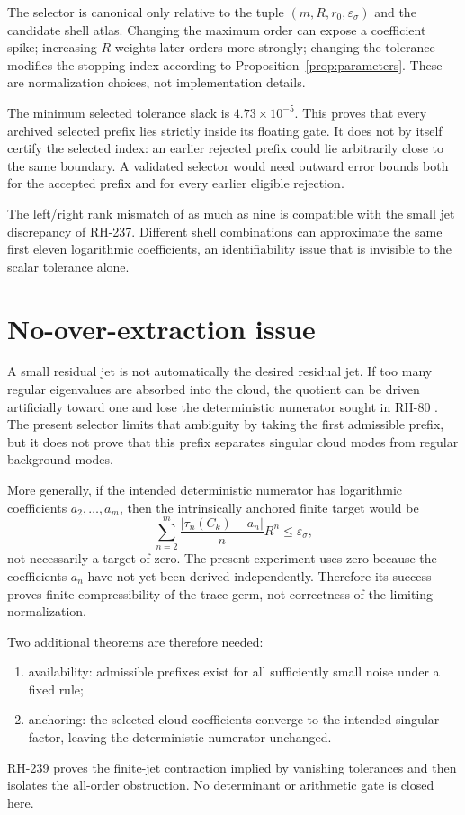 \documentclass[11pt]{article}
\theoremstyle{remark}
\begin{document}
The selector is canonical only relative to the tuple
$(m,R,r_0,\varepsilon_\sigma)$ and the candidate shell atlas.  Changing the
maximum order can expose a coefficient spike; increasing $R$ weights later
orders more strongly; changing the tolerance modifies the stopping index
according to Proposition~\ref{prop:parameters}.  These are normalization
choices, not implementation details.

The minimum selected tolerance slack is $4.73\times10^{-5}$.  This proves
that every archived selected prefix lies strictly inside its floating gate.
It does not by itself certify the selected index: an earlier rejected prefix
could lie arbitrarily close to the same boundary.  A validated selector
would need outward error bounds both for the accepted prefix and for every
earlier eligible rejection.

The left/right rank mismatch of as much as nine is compatible with the small
jet discrepancy of RH-237.  Different shell combinations can approximate the
same first eleven logarithmic coefficients, an identifiability issue that is
invisible to the scalar tolerance alone.

\section{No-over-extraction issue}

A small residual jet is not automatically the desired residual jet.  If too
many regular eigenvalues are absorbed into the cloud, the quotient can be
driven artificially toward one and lose the deterministic numerator sought
in RH-80 \citep{WangRH80}.  The present selector limits that ambiguity by
taking the first admissible prefix, but it does not prove that this prefix
separates singular cloud modes from regular background modes.

More generally, if the intended deterministic numerator has logarithmic
coefficients $a_2,\ldots,a_m$, then the intrinsically anchored finite target
would be
\[
 \sum_{n=2}^m\frac{|\tau_n(C_k)-a_n|}{n}R^n
 \le\varepsilon_\sigma,
\]
not necessarily a target of zero.  The present experiment uses zero because
the coefficients $a_n$ have not yet been derived independently.  Therefore
its success proves finite compressibility of the trace germ, not correctness
of the limiting normalization.

Two additional theorems are therefore needed:
\begin{enumerate}[leftmargin=2em]
\item availability: admissible prefixes exist for all sufficiently small
noise under a fixed rule;
\item anchoring: the selected cloud coefficients converge to the intended
singular factor, leaving the deterministic numerator unchanged.
\end{enumerate}

RH-239 proves the finite-jet contraction implied by vanishing tolerances and
then isolates the all-order obstruction.  No determinant or arithmetic gate
is closed here.



\end{document}
